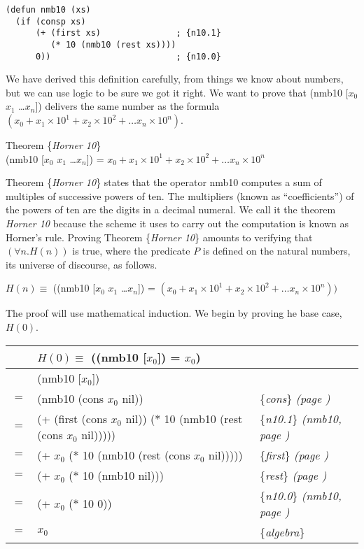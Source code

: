 \label{nmb10-defun}
\begin{Verbatim}
(defun nmb10 (xs)
  (if (consp xs)
      (+ (first xs)               ; {n10.1}
         (* 10 (nmb10 (rest xs))))
      0))                         ; {n10.0}
\end{Verbatim}

We have derived this definition carefully,
from things we know about numbers,
but we can use logic to be sure we got it right.
We want to prove that
(nmb10 [$x_0$ $x_1$ \dots $x_{n}$])
delivers the same number as the formula
$(x_0 + x_1 \times 10^1 + x_2 \times 10^2 + \dots x_{n} \times 10^{n})$.
\begin{samepage}
\label{horner10-thm}
\begin{center}
Theorem \{\emph{Horner 10}\} \\
(nmb10 [$x_0$ $x_1$ \dots $x_{n}$]) =
$x_0 + x_1 \times 10^1 + x_2 \times 10^2 + \dots x_{n} \times 10^{n}$
\end{center}
\end{samepage}

Theorem \{\emph{Horner 10}\} states that the operator nmb10
computes a sum of multiples of successive powers of ten.
The multipliers (known as ``coefficients'') of the powers
of ten are the digits in a decimal numeral.
We call it the theorem \emph{Horner 10} because
the scheme it uses to carry out the computation is
known as Horner's rule.
Proving Theorem \{\emph{Horner 10}\} amounts to
verifying that $(\forall n.H(n))$ is true,
where the predicate $P$ is defined on the natural numbers,
its universe of discourse, as follows.
\begin{center}
$H(n) \equiv$
((nmb10 [$x_0$ $x_1$ \dots $x_{n}$]) =
$(x_0 + x_1 \times 10^1 + x_2 \times 10^2 + \dots x_{n} \times 10^{n}))$
\end{center}

The proof will use mathematical induction.
We begin by proving he base case, $H(0)$.
\begin{center}
\begin{tabular}{lll}
    & $H(0) \equiv$ ((nmb10 [$x_0$]) = $x_0$) & \\
\hline
    & (nmb10 [$x_0$])           & \\
$=$ & (nmb10 (cons $x_0$ nil))  & \{\emph{cons}\} \emph{(page \pageref{first-rest-cons})} \\
$=$ & (+ (first (cons $x_0$ nil)) ($*$ 10 (nmb10 (rest (cons $x_0$ nil)))))  & \{\emph{n10.1}\} \emph{(nmb10, page \pageref{nmb10-defun})} \\
$=$ & (+ $x_0$ ($*$ 10 (nmb10 (rest (cons $x_0$ nil)))))  & \{\emph{first}\} \emph{(page \pageref{first-rest-cons})} \\
$=$ & (+ $x_0$ ($*$ 10 (nmb10 nil)))  & \{\emph{rest}\} \emph{(page \pageref{first-rest-cons})} \\
$=$ & (+ $x_0$ ($*$ 10 0))  & \{\emph{n10.0}\} \emph{(nmb10, page \pageref{nmb10-defun})} \\
$=$ & $x_0$  & \{\emph{algebra}\} \\
\end{tabular}
\end{center}

